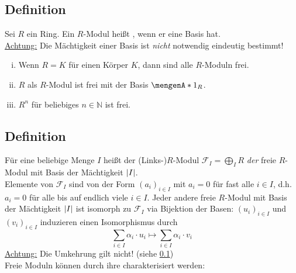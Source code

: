 \subsection[Definition: Freier Modul]{Definition} %
\label{sub:233}
Sei $R$ ein Ring. Ein $R$-Modul heißt , wenn er eine Basis hat. \\
\uline{Achtung:} Die Mächtigkeit einer Basis ist \emph{nicht} notwendig eindeutig bestimmt!
\begin{enumerate}[(i)]
	\item Wenn $R=K$ für einen Körper $K$, dann sind alle $R$-Moduln frei.
	\item $R$ als $R$-Modul ist frei mit der Basis $\set{1_R}$.
	\item $R^n$ für beliebiges $n \in \mathds{N}$ ist frei.
\end{enumerate}

\subsection[Definition: Freier $R$-Modul mit Basis der Mächtigkeit $\abs*{I}$]{Definition} %
\label{sub:234}
Für eine beliebige Menge $I$ heißt der (Links-)$R$-Modul $\mathcal{F}_I = \bigoplus_{I} R$ \emph{der} freie $R$-Modul mit Basis der Mächtigkeit $\abs*{I}$. \smallskip \\
Elemente von $\mathcal{F}_I$ sind von der Form $(a_i)_{i \in I}$ mit $a_i=0$ für fast alle $i \in I$, d.h. $a_i = 0$ für alle bis auf endlich viele $i \in I$. Jeder andere
freie $R$-Modul mit Basis der Mächtigkeit $\abs*{I}$ ist isomorph zu $\mathcal{F}_I$ via Bijektion der Basen: $(u_i)_{i \in I}$ und $(v_i)_{i \in I}$ induzieren einen 
Isomorphismus durch
\[
	\sum_{i \in I} \alpha_i \cdot u_i \mapsto \sum_{i \in I} \alpha_i \cdot v_i
\]
\uline{Achtung:} Die Umkehrung gilt nicht! (siehe \ref{sub:233}) \smallskip\\
Freie Moduln können durch ihre  charakterisiert werden:

